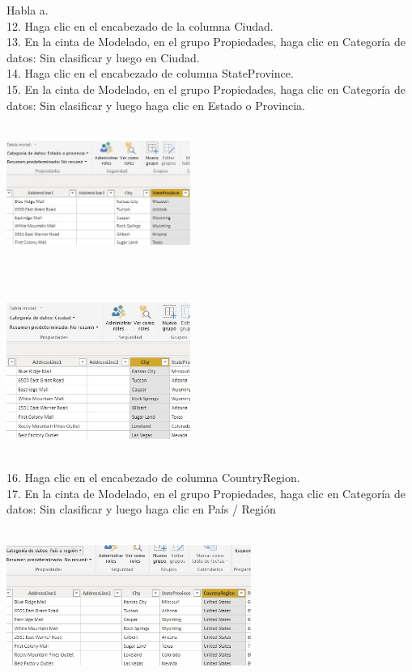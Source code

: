 \documentclass[12pt,letterpaper]{article}
\begin{document}
\begin{flushleft}
\begin{itemize}
Habla a.\\
12. Haga clic en el encabezado de la columna Ciudad.\\
13. En la cinta de Modelado, en el grupo Propiedades, haga clic en Categoría de datos: Sin clasificar y luego en Ciudad.\\
14. Haga clic en el encabezado de columna StateProvince.\\
15. En la cinta de Modelado, en el grupo Propiedades, haga clic en Categoría de datos: Sin clasificar y luego haga clic en Estado o
Provincia.\\
\textbf{ }\\
\begin{center}
	\includegraphics[width=6cm]{./Imagenes/image13} 
	\end{center}
\textbf{ }\\
\textbf{ }\\
\begin{center}
	\includegraphics[width=6cm]{./Imagenes/image14} 
	\end{center}
\textbf{ }\\

16. Haga clic en el encabezado de columna CountryRegion.\\
17. En la cinta de Modelado, en el grupo Propiedades, haga clic en Categoría de datos: Sin clasificar y luego haga clic en
País / Región\\
\textbf{ }\\
\begin{center}
	\includegraphics[width=8cm]{./Imagenes/image15} 
	\end{center}
\textbf{ }\\


\end{itemize}
\end{flushleft}
\end{document}
